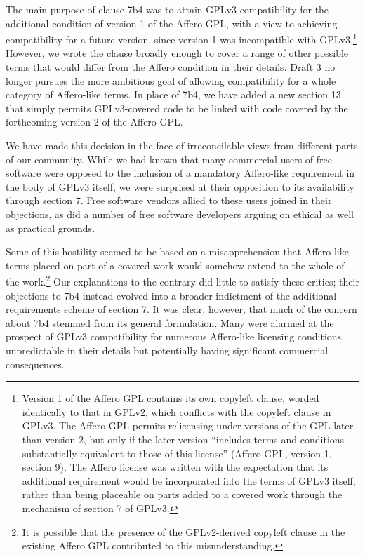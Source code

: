 The main purpose of clause 7b4 was to attain GPLv3 compatibility for the
additional condition of version 1 of the Affero GPL, with a view to
achieving compatibility for a future version, since version 1 was
incompatible with GPLv3.\footnote{Version 1 of the Affero GPL contains
its own copyleft clause, worded identically to that in GPLv2, which
conflicts with the copyleft clause in GPLv3.  The Affero GPL permits
relicensing under versions of the GPL later than version 2, but only if
the later version ``includes terms and conditions substantially
equivalent to those of this license'' (Affero GPL, version 1, section
9). The Affero license was written with the expectation that its
additional requirement would be incorporated into the terms of GPLv3
itself, rather than being placeable on parts added to a covered work
through the mechanism of section 7 of GPLv3.}  However, we wrote the
clause broadly enough to cover a range of other possible terms that
would differ from the Affero condition in their details. Draft 3 no
longer pursues the more ambitious goal of allowing compatibility for a
whole category of Affero-like terms.  In place of 7b4, we have added a
new section 13 that simply permits GPLv3-covered code to be linked with
code covered by the forthcoming version 2 of the Affero GPL.

We have made this decision in the face of irreconcilable views from
different parts of our community.  While we had known that many
commercial users of free software were opposed to the inclusion of a
mandatory Affero-like requirement in the body of GPLv3 itself, we were
surprised at their opposition to its availability through section 7.
Free software vendors allied to these users joined in their objections,
as did a number of free software developers arguing on ethical as well
as practical grounds.

Some of this hostility seemed to be based on a misapprehension that
Affero-like terms placed on part of a covered work would somehow extend
to the whole of the work.\footnote{It is possible that the presence of
the GPLv2-derived copyleft clause in the existing Affero GPL contributed
to this misunderstanding.}  Our explanations to the contrary did little
to satisfy these critics; their objections to 7b4 instead evolved into a
broader indictment of the additional requirements scheme of section 7.
It was clear, however, that much of the concern about 7b4 stemmed from
its general formulation.  Many were alarmed at the prospect of GPLv3
compatibility for numerous Affero-like licensing conditions,
unpredictable in their details but potentially having significant
commercial consequences.

